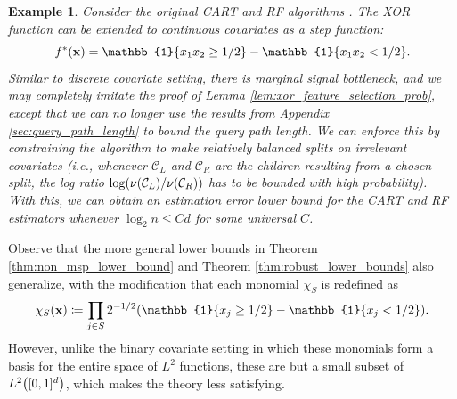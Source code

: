 \documentclass[11pt]{article}
\newtheorem{example}[theorem]{Example}
\newcommand{\bx}{\mathbf{x}}
\DeclarePairedDelimiter{\braces}{\lbrace}{\rbrace}
\DeclarePairedDelimiter{\paren}{(}{)}
\newcommand{\indicator}{\mathbb{1}}
\newcommand{\cell}{\mathcal{C}}
\newcommand{\ctsspace}{[0,1]^\nfeats}
\newcommand{\xmeasure}{\nu}
\newcommand{\nfeats}{d}
\newcommand{\nsamples}{n}
\newcommand{\monomial}{\chi}
\begin{document}
\begin{example}
    Consider the original CART and RF algorithms \citep{friedman2001elements}.
    The XOR function can be extended to continuous covariates as a step function:
    \begin{equation}
        f^*(\bx) = \indicator\braces*{x_1x_2 \geq 1/2} - \indicator\braces*{x_1x_2 < 1/2}.
    \end{equation}
    Similar to discrete covariate setting, there is marginal signal bottleneck, and we may completely imitate the proof of Lemma \ref{lem:xor_feature_selection_prob}, except that we can no longer use the results from Appendix \ref{sec:query_path_length} to bound the query path length.
    We can enforce this by constraining the algorithm to make relatively balanced splits on irrelevant covariates (i.e., whenever $\cell_L$ and $\cell_R$ are the children resulting from a chosen split, the log ratio $\log\paren*{\xmeasure(\cell_L)/\xmeasure(\cell_R)}$ has to be bounded with high probability).
    With this, we can obtain 
    an estimation error lower bound for the CART and RF estimators whenever $\log_2\nsamples \leq C\nfeats$ for some universal $C$.
\end{example}

Observe that the more general lower bounds in Theorem \ref{thm:non_msp_lower_bound} and Theorem \ref{thm:robust_lower_bounds} also generalize, with the modification that each monomial $\monomial_S$ is redefined as 
\begin{equation}
    \monomial_S(\bx) \coloneqq \prod_{j \in S} 2^{-1/2}\paren*{\indicator\braces*{x_j \geq 1/2} - \indicator\braces*{x_j < 1/2}}.
\end{equation}
However, unlike the binary covariate setting in which these monomials form a basis for the entire space of $L^2$ functions, these are but a small subset of $L^2\paren*{\ctsspace}$, which makes the theory less satisfying.
\end{document}
